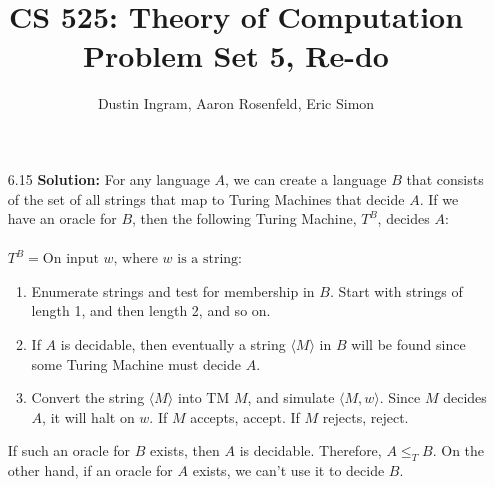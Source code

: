 \documentclass{article}
\title{CS 525: Theory of Computation\\ Problem Set 5, Re-do}
\author{Dustin Ingram, Aaron Rosenfeld, Eric Simon}
\begin{document}
\maketitle
\begin{enumerate}
    \item[6.15] \textbf{Solution:}
    For any language $A$, we can create a language $B$ that consists of the
    set of all strings that map to Turing Machines that decide $A$. If we
    have an oracle for $B$, then the following Turing Machine, $T^{B}$,
    decides $A$: \\ \\
    $T^{B} = \text{On input $w$, where $w$ is a string}$:
    \begin{enumerate}
        \item Enumerate strings and test for membership in $B$. Start with strings
    of length 1, and then length 2, and so on.
        \item If $A$ is decidable, then eventually a string $\langle M\rangle$ in $B$ will be found
    since some Turing Machine must decide $A$.
        \item Convert the string $\langle M\rangle$ into TM $M$, and simulate $\langle M,w \rangle$. Since $M$ decides $A$, it will halt on $w$. If $M$ accepts, accept. If
    $M$ rejects, reject.
    \end{enumerate}
    If such an oracle for $B$ exists, then $A$ is decidable. Therefore, $A\leq_{T}B$.
    On the other hand, if an oracle for $A$ exists, we can't use it to decide
    $B$.
    \end{enumerate}
\end{document}
